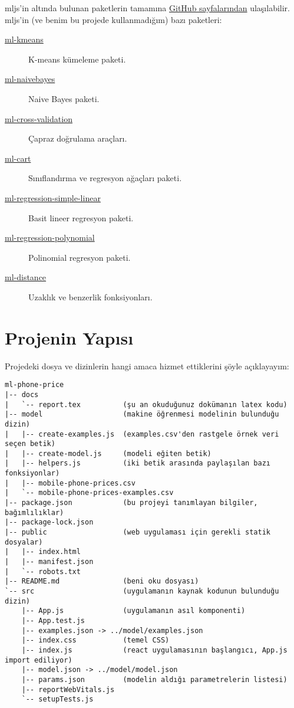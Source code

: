 \documentclass[a4paper,12pt]{article}
\begin{document}
mljs'in altında bulunan paketlerin tamamına \href{https://github.com/mljs/ml#readme}{GitHub sayfalarından} ulaşılabilir.
mljs'in (ve benim bu projede kullanmadığım) bazı paketleri:

\begin{description}
 \item[\href{https://github.com/mljs/kmeans}{ml-kmeans}] K-means kümeleme paketi.
 \item[\href{https://github.com/mljs/naive-bayes}{ml-naivebayes}] Naive Bayes paketi.
 \item[\href{https://github.com/mljs/cross-validation}{ml-cross-validation}] Çapraz doğrulama araçları.
 \item[\href{https://github.com/mljs/decision-tree-cart}{ml-cart}] Sınıflandırma ve regresyon ağaçları paketi.
 \item[\href{https://github.com/mljs/regression-simple-linear}{ml-regression-simple-linear}] Basit lineer regresyon paketi.
 \item[\href{https://github.com/mljs/regression-polynomial}{ml-regression-polynomial}] Polinomial regresyon paketi.
 \item[\href{https://github.com/mljs/distance}{ml-distance}] Uzaklık ve benzerlik fonksiyonları.
\end{description}

\newpage


\section{Projenin Yapısı}

Projedeki dosya ve dizinlerin hangi amaca hizmet ettiklerini şöyle açıklayayım:
\begin{verbatim}
ml-phone-price
|-- docs
|   `-- report.tex          (şu an okuduğunuz dokümanın latex kodu)
|-- model                   (makine öğrenmesi modelinin bulunduğu dizin)
|   |-- create-examples.js  (examples.csv'den rastgele örnek veri seçen betik)
|   |-- create-model.js     (modeli eğiten betik)
|   |-- helpers.js          (iki betik arasında paylaşılan bazı fonksiyonlar)
|   |-- mobile-phone-prices.csv
|   `-- mobile-phone-prices-examples.csv
|-- package.json            (bu projeyi tanımlayan bilgiler, bağımlılıklar)
|-- package-lock.json
|-- public                  (web uygulaması için gerekli statik dosyalar)
|   |-- index.html
|   |-- manifest.json
|   `-- robots.txt
|-- README.md               (beni oku dosyası)
`-- src                     (uygulamanın kaynak kodunun bulunduğu dizin)
    |-- App.js              (uygulamanın asıl komponenti)
    |-- App.test.js
    |-- examples.json -> ../model/examples.json
    |-- index.css           (temel CSS)
    |-- index.js            (react uygulamasının başlangıcı, App.js import ediliyor)
    |-- model.json -> ../model/model.json
    |-- params.json         (modelin aldığı parametrelerin listesi)
    |-- reportWebVitals.js
    `-- setupTests.js
\end{verbatim}
\end{document}
